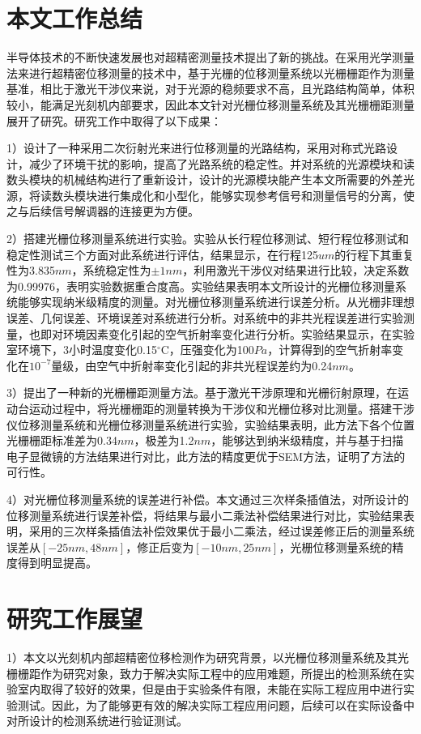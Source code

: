 \documentclass[type=master,oneside]{fduthesis}
\begin{document}
\section{本文工作总结}
半导体技术的不断快速发展也对超精密测量技术提出了新的挑战。在采用光学测量法来进行超精密位移测量的技术中，基于光栅的位移测量系统以光栅栅距作为测量基准，相比于激光干涉仪来说，对于光源的稳频要求不高，且光路结构简单，体积较小，能满足光刻机内部要求，因此本文针对光栅位移测量系统及其光栅栅距测量展开了研究。研究工作中取得了以下成果：

1）设计了一种采用二次衍射光来进行位移测量的光路结构，采用对称式光路设计，减少了环境干扰的影响，提高了光路系统的稳定性。并对系统的光源模块和读数头模块的机械结构进行了重新设计，设计的光源模块能产生本文所需要的外差光源，将读数头模块进行集成化和小型化，能够实现参考信号和测量信号的分离，使之与后续信号解调器的连接更为方便。

2）搭建光栅位移测量系统进行实验。实验从长行程位移测试、短行程位移测试和稳定性测试三个方面对此系统进行评估，结果显示，在行程125$um$的行程下其重复性为3.835$nm$，系统稳定性为$\pm 1nm$，利用激光干涉仪对结果进行比较，决定系数为0.99976，表明实验数据重合度高。实验结果表明本文所设计的光栅位移测量系统能够实现纳米级精度的测量。对光栅位移测量系统进行误差分析。从光栅非理想误差、几何误差、环境误差对系统进行分析。对系统中的非共光程误差进行实验测量，也即对环境因素变化引起的空气折射率变化进行分析。实验结果显示，在实验室环境下，3小时温度变化0.15${ }^{\circ} \mathrm{C}$，压强变化为100$Pa$，计算得到的空气折射率变化在$10^{-7}$量级，由空气中折射率变化引起的非共光程误差约为0.24$nm$。

3）提出了一种新的光栅栅距测量方法。基于激光干涉原理和光栅衍射原理，在运动台运动过程中，将光栅栅距的测量转换为干涉仪和光栅位移对比测量。搭建干涉仪位移测量系统和光栅位移测量系统进行实验，实验结果表明，此方法下各个位置光栅栅距标准差为0.34$nm$，极差为1.2$nm$，能够达到纳米级精度，并与基于扫描电子显微镜的方法结果进行对比，此方法的精度更优于SEM方法，证明了方法的可行性。

4）对光栅位移测量系统的误差进行补偿。本文通过三次样条插值法，对所设计的位移测量系统进行误差补偿，将结果与最小二乘法补偿结果进行对比，实验结果表明，采用的三次样条插值法补偿效果优于最小二乘法，经过误差修正后的测量系统误差从$[-25nm,48nm]$，修正后变为$[-10nm,25nm]$，光栅位移测量系统的精度得到明显提高。


\section{研究工作展望}
1）本文以光刻机内部超精密位移检测作为研究背景，以光栅位移测量系统及其光栅栅距作为研究对象，致力于解决实际工程中的应用难题，所提出的检测系统在实验室内取得了较好的效果，但是由于实验条件有限，未能在实际工程应用中进行实验测试。因此，为了能够更有效的解决实际工程应用问题，后续可以在实际设备中对所设计的检测系统进行验证测试。
\end{document}
